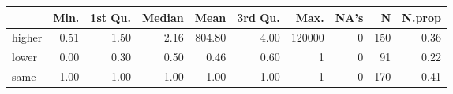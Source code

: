 \begin{table}[ht]
\centering
\begin{tabular}{lrrrrrrrrr}
  \hline
 & Min. & 1st Qu. & Median & Mean & 3rd Qu. & Max. & NA's & N & N.prop \\ 
  \hline
higher & 0.51 & 1.50 & 2.16 & 804.80 & 4.00 & 120000 &   0 & 150 & 0.36 \\ 
  lower & 0.00 & 0.30 & 0.50 & 0.46 & 0.60 &   1 &   0 &  91 & 0.22 \\ 
  same & 1.00 & 1.00 & 1.00 & 1.00 & 1.00 &   1 &   0 & 170 & 0.41 \\ 
   \hline
\end{tabular}
\end{table}
